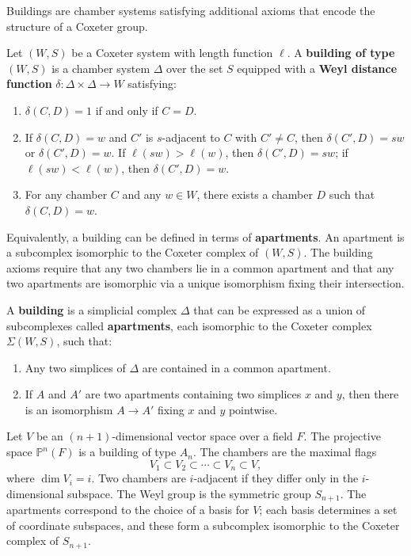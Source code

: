 Buildings are chamber systems satisfying additional axioms that encode the structure of a Coxeter group.

\begin{definition}[Building]
Let \((W, S)\) be a Coxeter system with length function \(\ell\). A \textbf{building of type \((W, S)\)} is a chamber system \(\Delta\) over the set \(S\) equipped with a \textbf{Weyl distance function} \(\delta: \Delta \times \Delta \to W\) satisfying:
\begin{enumerate}
    \item \(\delta(C, D) = 1\) if and only if \(C = D\).
    \item If \(\delta(C, D) = w\) and \(C'\) is \(s\)-adjacent to \(C\) with \(C' \neq C\), then \(\delta(C', D) = s w\) or \(\delta(C', D) = w\). If \(\ell(s w) > \ell(w)\), then \(\delta(C', D) = s w\); if \(\ell(s w) < \ell(w)\), then \(\delta(C', D) = w\).
    \item For any chamber \(C\) and any \(w \in W\), there exists a chamber \(D\) such that \(\delta(C, D) = w\).
\end{enumerate}
\end{definition}

Equivalently, a building can be defined in terms of \textbf{apartments}. An apartment is a subcomplex isomorphic to the Coxeter complex of \((W, S)\). The building axioms require that any two chambers lie in a common apartment and that any two apartments are isomorphic via a unique isomorphism fixing their intersection.

\begin{definition}
A \textbf{building} is a simplicial complex \(\Delta\) that can be expressed as a union of subcomplexes called \textbf{apartments}, each isomorphic to the Coxeter complex \(\Sigma(W, S)\), such that:
\begin{enumerate}
    \item Any two simplices of \(\Delta\) are contained in a common apartment.
    \item If \(A\) and \(A'\) are two apartments containing two simplices \(x\) and \(y\), then there is an isomorphism \(A \to A'\) fixing \(x\) and \(y\) pointwise.
\end{enumerate}
\end{definition}

\begin{example}
Let \(V\) be an \((n+1)\)-dimensional vector space over a field \(F\). The projective space \(\mathbb{P}^n(F)\) is a building of type \(A_n\). The chambers are the maximal flags
\[
V_1 \subset V_2 \subset \cdots \subset V_n \subset V,
\]
where \(\dim V_i = i\). Two chambers are \(i\)-adjacent if they differ only in the \(i\)-dimensional subspace. The Weyl group is the symmetric group \(S_{n+1}\). The apartments correspond to the choice of a basis for \(V\); each basis determines a set of coordinate subspaces, and these form a subcomplex isomorphic to the Coxeter complex of \(S_{n+1}\).
\end{example}

